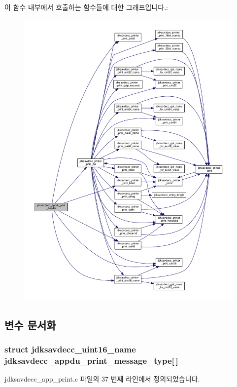 이 함수 내부에서 호출하는 함수들에 대한 그래프입니다.\+:
\nopagebreak
\begin{figure}[H]
\begin{center}
\leavevmode
\includegraphics[width=350pt]{group__app__print_ga0181e0ff0a30d202cd45f2f414a8c575_cgraph}
\end{center}
\end{figure}




\subsection{변수 문서화}
\subsubsection[{\texorpdfstring{jdksavdecc\+\_\+appdu\+\_\+print\+\_\+message\+\_\+type}{jdksavdecc_appdu_print_message_type}}]{\setlength{\rightskip}{0pt plus 5cm}struct {\bf jdksavdecc\+\_\+uint16\+\_\+name} jdksavdecc\+\_\+appdu\+\_\+print\+\_\+message\+\_\+type\mbox{[}$\,$\mbox{]}}\hypertarget{group__app__print_gacf0a940a6c4ba23d14ff138ab52dbc45}{}\label{group__app__print_gacf0a940a6c4ba23d14ff138ab52dbc45}


jdksavdecc\+\_\+app\+\_\+print.\+c 파일의 37 번째 라인에서 정의되었습니다.

